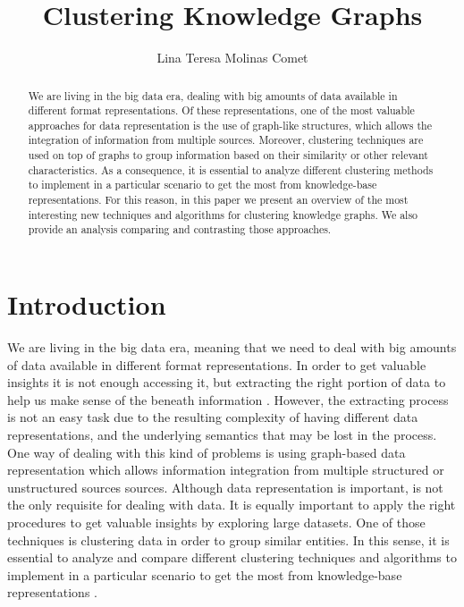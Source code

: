 \documentclass[runningheads]{llncs}
\begin{document}
%
\title{Clustering Knowledge Graphs}
%
%
\author{Lina Teresa Molinas Comet}
%
%
%
\maketitle              %
%
\begin{abstract}
We are living in the big data era, dealing with big amounts of data available in different format representations. Of these representations, one of the most valuable approaches for data representation is the use of graph-like structures, which allows the integration of information from multiple sources. Moreover, clustering techniques are used on top of graphs to group information based on their similarity or other relevant characteristics. As a consequence, it is essential to analyze different clustering methods to implement in a particular scenario to get the most from knowledge-base representations. For this reason, in this paper we present an overview of the most interesting new techniques and algorithms for clustering knowledge graphs. We also provide an analysis comparing and contrasting those approaches.

\end{abstract}
%
%
%
\section{Introduction} \label{introduction}
We are living in the big data era, meaning that we need to deal with big amounts of data available in different format representations. In order to get valuable insights it is not enough accessing it, but extracting the right portion of data to help us make sense of the beneath information \cite{Pedrycz}. However, the extracting process is not an easy task due to the resulting complexity of having different data representations, and the underlying semantics that may be lost in the process. One way of dealing with this kind of problems is using graph-based data representation which allows information integration from multiple structured or unstructured sources sources.
Although data representation is important, is not the only requisite for dealing with data. It is equally important to apply the right procedures to get valuable insights by exploring large datasets. One of those techniques is clustering data in order to group similar entities.  In this sense, it is essential to analyze and compare different clustering techniques and algorithms to implement in a particular scenario to get the most from knowledge-base representations \cite{Pedrycz}.
\end{document}
